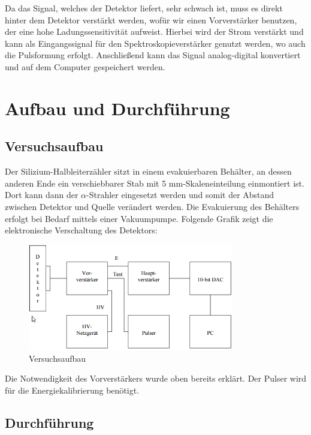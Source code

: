 \documentclass[bigchapter,colorback,accentcolor=tud4b,linedtoc,11pt]{tudreport}
\begin{document}
Da das Signal, welches der Detektor liefert, sehr schwach ist, muss es direkt hinter dem Detektor verstärkt werden, wofür wir einen Vorverstärker benutzen, der eine hohe Ladungssensitivität aufweist. Hierbei wird der Strom verstärkt und kann als Eingangssignal für den Spektroskopieverstärker genutzt werden, wo auch die Pulsformung erfolgt. Anschließend kann das Signal analog-digital konvertiert und auf dem Computer gespeichert werden. \cite{Halbleiter}

\chapter{Aufbau und Durchführung}

\section{Versuchsaufbau}

Der Silizium-Halbleiterzähler sitzt in einem evakuierbaren Behälter, an dessen anderen Ende ein verschiebbarer Stab mit 5 mm-Skaleneinteilung einmontiert ist. Dort kann dann der $\alpha$-Strahler eingesetzt werden und somit der Abstand zwischen Detektor und Quelle verändert werden. Die Evakuierung des Behälters erfolgt bei Bedarf mittels einer Vakuumpumpe. Folgende Grafik zeigt die elektronische Verschaltung des Detektors: 

\begin{figure}[h] 
  \centering
     \includegraphics[width=0.8\textwidth]{img/Aufbau.png}
  \caption{Versuchsaufbau \cite{anleitung}}
  \label{fig:Bild1}
\end{figure}

Die Notwendigkeit des Vorverstärkers wurde oben bereits erklärt. Der Pulser wird für die Energiekalibrierung benötigt. 

\section{Durchführung}
\end{document}
